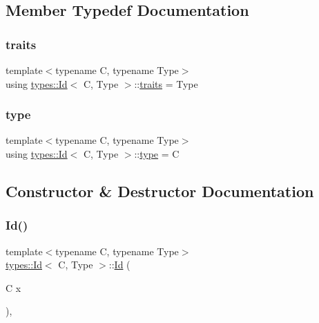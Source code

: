 \subsection{Member Typedef Documentation}
\mbox{\label{classtypes_1_1_id_a8682580e9156701f2366091360d85b92}} 
\subsubsection{\texorpdfstring{traits}{traits}}
{\footnotesize\ttfamily template$<$typename C, typename Type$>$ \\
using \mbox{\hyperlink{classtypes_1_1_id}{types\+::\+Id}}$<$ C, Type $>$\+::\mbox{\hyperlink{classtypes_1_1_id_a8682580e9156701f2366091360d85b92}{traits}} =  Type}

\mbox{\label{classtypes_1_1_id_a3460149759853c50fa31ad199e73419a}} 
\subsubsection{\texorpdfstring{type}{type}}
{\footnotesize\ttfamily template$<$typename C, typename Type$>$ \\
using \mbox{\hyperlink{classtypes_1_1_id}{types\+::\+Id}}$<$ C, Type $>$\+::\mbox{\hyperlink{classtypes_1_1_id_a3460149759853c50fa31ad199e73419a}{type}} =  C}



\subsection{Constructor \& Destructor Documentation}
\mbox{\label{classtypes_1_1_id_acd8d5b53062c84735cd77f1b410857d1}} 
\subsubsection{\texorpdfstring{Id()}{Id()}}
{\footnotesize\ttfamily template$<$typename C, typename Type$>$ \\
\mbox{\hyperlink{classtypes_1_1_id}{types\+::\+Id}}$<$ C, Type $>$\+::\mbox{\hyperlink{classtypes_1_1_id}{Id}} (\begin{DoxyParamCaption}\item[{C}]{x }\end{DoxyParamCaption})\hspace{0.3cm}{\ttfamily [inline]}, {\ttfamily [explicit]}}




